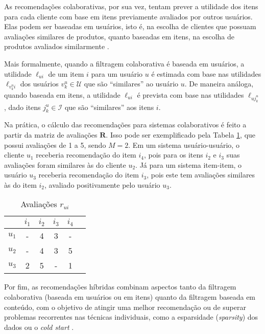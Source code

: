 As recomendações colaborativas, por sua vez, tentam prever a utilidade dos itens para cada cliente com base em itens previamente avaliados por outros usuários. Elas podem ser baseadas em usuários, isto é, na escolha de clientes  que possuam avaliações similares de produtos, quanto baseadas em itens, na escolha de produtos avaliados similarmente \cite{linden2003amazon}.

Mais formalmente, quando a filtragem colaborativa é baseada em usuários, a utilidade $\ell_{ui}$ de um item $i$ para um usuário $u$ é estimada com base nas utilidades $\ell_{v_k^u i}$ dos usuários $v_k^u \in \mathcal{U}$ que são ``similares'' ao usuário $u$.  De maneira análoga, quando baseada em itens, a utilidade $\ell_{ui}$ é prevista com base nas utilidades $\ell_{u j_k^u}$, dado itens $j_k^u \in \mathcal{I}$ que são ``similares'' aos itens $i$. 

Na prática, o cálculo das recomendações para sistemas colaborativos é feito a partir da matriz de avaliações $\mathbf{R}$. Isso pode ser exemplificado pela Tabela \ref{tab:rui}, que possui avaliações de 1 a 5, sendo $M=2$. Em um sistema usuário-usuário, o cliente $u_1$ receberia recomendação do item $i_4$, pois para os itens $i_2$ e $i_3$ suas avaliações foram similares às do cliente $u_2$. Já para um sistema item-item, o usuário $u_3$ receberia recomendação do item $i_3$, pois este tem avaliações similares às do item $i_2$, avaliado positivamente pelo usuário $u_3$.

\begin{table}[h]
\begin{center}
	\caption{Avaliações $r_{ui}$}
	\label{tab:rui}
    \begin{tabular}{ | c | c | c | c | c | c |} 
    \hline
     & $i_1$ & $i_2$ & $i_3$ & $i_4$ \\ \hline
     $u_1$ & - & 4 & 3 & - \\ \hline
     $u_2$ & - & 4 & 3 & 5 \\ \hline
     $u_3$ & 2 & 5 & - & 1 \\ \hline
    \end{tabular}
\end{center}
\end{table}


Por fim, as recomendações híbridas combinam aspectos tanto da filtragem colaborativa (baseada em usuários ou em itens) quanto da filtragem baseada em conteúdo, com o objetivo de atingir uma melhor recomendação ou de superar problemas recorrentes nas técnicas individuais, como a esparsidade (\textit{sparsity}) dos dados ou o \textit{cold start} \cite{burke2007hybrid}.

